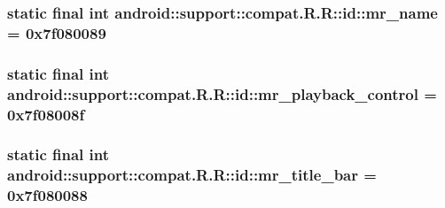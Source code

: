\hypertarget{classandroid_1_1support_1_1compat_1_1_r_1_1id_688b3ca0e460b4193622e99ecfc000e4}{
\subsubsection[{mr\_\-name}]{\setlength{\rightskip}{0pt plus 5cm}static final int android::support::compat.R.R::id::mr\_\-name = 0x7f080089}}
\label{classandroid_1_1support_1_1compat_1_1_r_1_1id_688b3ca0e460b4193622e99ecfc000e4}


\hypertarget{classandroid_1_1support_1_1compat_1_1_r_1_1id_0e6b56e0ab0254660265cb1c6c2b6906}{
\subsubsection[{mr\_\-playback\_\-control}]{\setlength{\rightskip}{0pt plus 5cm}static final int android::support::compat.R.R::id::mr\_\-playback\_\-control = 0x7f08008f}}
\label{classandroid_1_1support_1_1compat_1_1_r_1_1id_0e6b56e0ab0254660265cb1c6c2b6906}


\hypertarget{classandroid_1_1support_1_1compat_1_1_r_1_1id_826d2be1e52aa4c1eec2b1709f401744}{
\subsubsection[{mr\_\-title\_\-bar}]{\setlength{\rightskip}{0pt plus 5cm}static final int android::support::compat.R.R::id::mr\_\-title\_\-bar = 0x7f080088}}
\label{classandroid_1_1support_1_1compat_1_1_r_1_1id_826d2be1e52aa4c1eec2b1709f401744}


